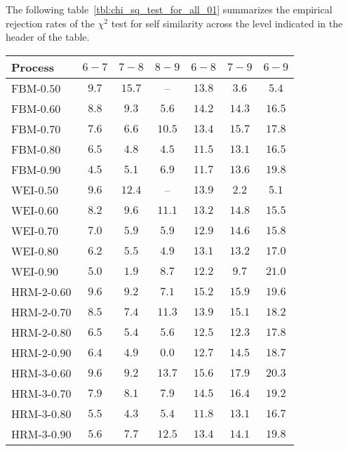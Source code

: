 The following table~\ref{tbl:chi_sq_test_for_all_01} summarizes the empirical rejection
rates of the $\chi^2$ test for self similarity across the level indicated in the header
of the table.
\begin{table}[h]\begin{center}
	\begin{tabular}{l||c|c|c|c|c|c|}
	Process 		& $6-7$ &  $7-8$ &  $8-9$ &  $6-8$ &  $7-9$ &  $6-9$ \\ \hline\hline
	  FBM-$0.50$	& $9.7$ & $15.7$ &     -- & $13.8$ &  $\mathbf{3.6}$ &  $5.4$ \\ \hline
	  FBM-$0.60$	& $8.8$ &  $9.3$ &  $\mathbf{5.6}$ & $14.2$ & $14.3$ & $16.5$ \\ \hline
	  FBM-$0.70$	& $7.6$ &  $\mathbf{6.6}$ & $10.5$ & $13.4$ & $15.7$ & $17.8$ \\ \hline
	  FBM-$0.80$	& $6.5$ &  $4.8$ &  $\mathbf{4.5}$ & $11.5$ & $13.1$ & $16.5$ \\ \hline
	  FBM-$0.90$	& $\mathbf{4.5}$ &  $5.1$ &  $6.9$ & $11.7$ & $13.6$ & $19.8$ \\ \hline\hline

	  WEI-$0.50$	& $9.6$ & $12.4$ &     -- & $13.9$ &  $\mathbf{2.2}$ &  $5.1$ \\ \hline
	  WEI-$0.60$	& $\mathbf{8.2}$ &  $9.6$ & $11.1$ & $13.2$ & $14.8$ & $15.5$ \\ \hline
	  WEI-$0.70$	& $7.0$ &  $\mathbf{5.9}$ &  $\mathbf{5.9}$ & $12.9$ & $14.6$ & $15.8$ \\ \hline
	  WEI-$0.80$	& $6.2$ &  $5.5$ &  $\mathbf{4.9}$ & $13.1$ & $13.2$ & $17.0$ \\ \hline
	  WEI-$0.90$	& $5.0$ &  $\mathbf{1.9}$ &  $8.7$ & $12.2$ &  $9.7$ & $21.0$ \\ \hline\hline

	HRM-2-$0.60$ 	& $9.6$ &  $9.2$ &  $\mathbf{7.1}$ & $15.2$ & $15.9$ & $19.6$ \\ \hline
	HRM-2-$0.70$ 	& $8.5$ &  $\mathbf{7.4}$ & $11.3$ & $13.9$ & $15.1$ & $18.2$ \\ \hline
	HRM-2-$0.80$ 	& $6.5$ &  $\mathbf{5.4}$ &  $5.6$ & $12.5$ & $12.3$ & $17.8$ \\ \hline
	HRM-2-$0.90$ 	& $6.4$ &  $\mathbf{4.9}$ &  $0.0$ & $12.7$ & $14.5$ & $18.7$ \\ \hline\hline

	HRM-3-$0.60$ 	& $9.6$ &  $\mathbf{9.2}$ & $13.7$ & $15.6$ & $17.9$ & $20.3$ \\ \hline
	HRM-3-$0.70$ 	& $\mathbf{7.9}$ &  $8.1$ &  $\mathbf{7.9}$ & $14.5$ & $16.4$ & $19.2$ \\ \hline
	HRM-3-$0.80$ 	& $5.5$ &  $\mathbf{4.3}$ &  $5.4$ & $11.8$ & $13.1$ & $16.7$ \\ \hline
	HRM-3-$0.90$ 	& $\mathbf{5.6}$ &  $7.7$ & $12.5$ & $13.4$ & $14.1$ & $19.8$ \\ \hline\hline


\end{tabular}
\end{center}
\end{table}
